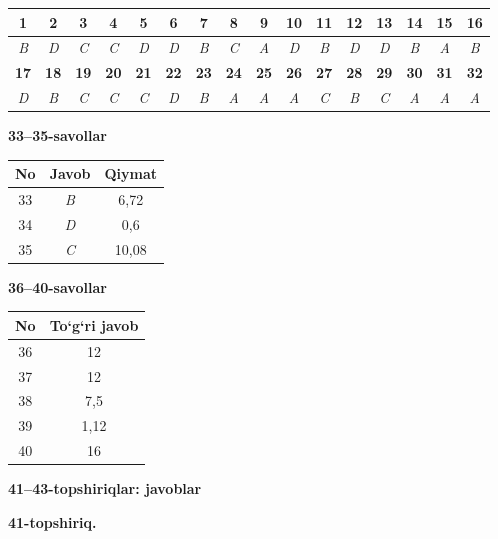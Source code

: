 \documentclass[11pt,a4paper]{article}
\begin{document}
\noindent\begin{tabular}{|c|c|c|c|c|c|c|c|c|c|c|c|c|c|c|c|}\hline
\textbf{1} & \textbf{2} & \textbf{3} & \textbf{4} & \textbf{5} & \textbf{6} & \textbf{7} & \textbf{8} & \textbf{9} & \textbf{10} & \textbf{11} & \textbf{12} & \textbf{13} & \textbf{14} & \textbf{15} & \textbf{16}\\\hline
\textsl{B} & \textsl{D} & \textsl{C} & \textsl{C} & \textsl{D} & \textsl{D} & \textsl{B} & \textsl{C} & \textsl{A} & \textsl{D} & \textsl{B} & \textsl{D} & \textsl{D} & \textsl{B} & \textsl{A} & \textsl{B}\\\hline
\textbf{17} & \textbf{18} & \textbf{19} & \textbf{20} & \textbf{21} & \textbf{22} & \textbf{23} & \textbf{24} & \textbf{25} & \textbf{26} & \textbf{27} & \textbf{28} & \textbf{29} & \textbf{30} & \textbf{31} & \textbf{32}\\\hline
\textsl{D} & \textsl{B} & \textsl{C} & \textsl{C} & \textsl{C} & \textsl{D} & \textsl{B} & \textsl{A} & \textsl{A} & \textsl{A} & \textsl{C} & \textsl{B} & \textsl{C} & \textsl{A} & \textsl{A} & \textsl{A}\\\hline
\end{tabular}\par\medskip
\noindent\textbf{33--35-savollar}\par\smallskip
\noindent\begin{tabular}{|c|c|c|}\hline \textbf{No} & \textbf{Javob} & \textbf{Qiymat}\\\hline
33 & \textsl{B} & 6,72\\\hline
34 & \textsl{D} & 0,6\\\hline
35 & \textsl{C} & 10,08\\\hline
\end{tabular}\par\medskip
\noindent\textbf{36--40-savollar}\par\smallskip
\noindent\begin{tabular}{|c|c|}\hline \textbf{No} & \textbf{To`g`ri javob}\\\hline
36 & 12\\\hline
37 & 12\\\hline
38 & 7,5\\\hline
39 & 1,12\\\hline
40 & 16\\\hline
\end{tabular}\par\medskip
\noindent\textbf{41--43-topshiriqlar: javoblar}\par\smallskip
\noindent\textbf{41-topshiriq.}\par
\end{document}
